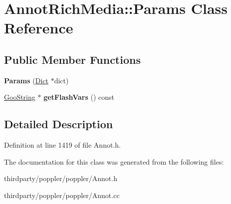 \hypertarget{class_annot_rich_media_1_1_params}{}\section{Annot\+Rich\+Media\+:\+:Params Class Reference}
\label{class_annot_rich_media_1_1_params}
\subsection*{Public Member Functions}
\begin{DoxyCompactItemize}
\item 
\mbox{\label{class_annot_rich_media_1_1_params_a5fdf1ec0a92bfc9ed31d3c869ae1ae8b}} 
{\bfseries Params} (\hyperlink{class_dict}{Dict} $\ast$dict)
\item 
\mbox{\label{class_annot_rich_media_1_1_params_a5423a687a22cb4b66139b9b8c184b3f9}} 
\hyperlink{class_goo_string}{Goo\+String} $\ast$ {\bfseries get\+Flash\+Vars} () const
\end{DoxyCompactItemize}


\subsection{Detailed Description}


Definition at line 1419 of file Annot.\+h.



The documentation for this class was generated from the following files\+:\begin{DoxyCompactItemize}
\item 
thirdparty/poppler/poppler/Annot.\+h\item 
thirdparty/poppler/poppler/Annot.\+cc\end{DoxyCompactItemize}
